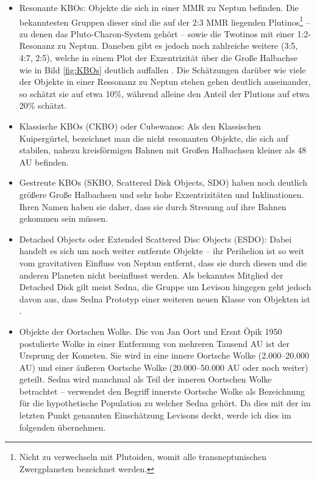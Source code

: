 \documentclass[12pt,a4paper,twoside,open=right,bibliography=totoc]{scrbook}
\renewcommand{\cite}{ \citep}
\begin{document}
\begin{itemize}
\item Resonante KBOs: Objekte die sich in einer MMR zu Neptun befinden. Die bekanntesten Gruppen dieser sind die auf der 2:3 MMR liegenden Plutinos\footnote{Nicht zu verwechseln mit Plutoiden, womit alle transneptunischen Zwergplaneten bezeichnet werden.} -- zu denen das Pluto-Charon-System gehört -- sowie die Twotinos mit einer 1:2-Resonanz zu Neptun. Daneben gibt es jedoch noch zahlreiche weitere (3:5, 4:7, 2:5), welche in einem Plot der Exzentrizität über die Große Halbachse wie in Bild \ref{fig:KBOs} deutlich auffallen\cite{Levison2008}.
Die Schätzungen darüber wie viele der Objekte in einer Ressonanz zu Neptun stehen gehen deutlich auseinander, 
so schätzt sie \cite{Trujillo2001,Levison2008} auf etwa 10\%, während \cite{Kavelaars2008,Levison2008} alleine den Anteil der Plutions auf etwa 20\% schätzt.
\item Klassische KBOs (CKBO) oder Cubewanos: Als den Klassischen Kuipergürtel, bezeichnet man die nicht resonanten Objekte, die sich auf stabilen, nahezu kreisförmigen Bahnen mit Großen Halbachsen kleiner als 48 AU befinden.
\item Gestreute KBOs (SKBO, Scattered Disk Objects, SDO) haben noch deutlich größere Große Halbachsen und sehr hohe Exzentrizitäten und Inklinationen. Ihren Namen haben sie daher, dass sie durch Streuung auf ihre Bahnen gekommen sein müssen.
\item Detached Objects oder Extended Scattered Disc Objects (ESDO): Dabei handelt es sich um noch weiter entfernte Objekte -- ihr Perihelion ist so weit vom gravitativen Einfluss von Neptun entfernt, dass sie durch diesen und die anderen Planeten nicht beeinflusst werden. Als bekanntes Mitglied der Detached Disk gilt meist Sedna, die Gruppe um Levison hingegen geht jedoch davon aus, dass Sedna Prototyp einer weiteren neuen Klasse von Objekten ist\cite{Morbidelli2004,Kenyon2004,Brasser2006,Levison2008}.
\item Objekte der Oortschen Wolke. Die von Jan Oort und Ersnt Öpik 1950 postulierte Wolke in einer Entfernung von mehreren Tausend AU ist der Ursprung der Kometen. Sie wird in eine innere Oortsche  Wolke (2.000–20.000 AU) und einer äußeren Oortsche Wolke (20.000–50.000 AU oder noch weiter) geteilt. Sedna wird manchmal als Teil der inneren Oortschen Wolke betrachtet – \cite{Brasser2008} verwendet den Begriff innerste Oortsche Wolke als Bezeichnung für die hypothetische Population zu welcher Sedna gehört. Da dies mit der im letzten Punkt genannten Einschätzung Levisons deckt, werde ich dies im folgenden übernehmen.
\end{itemize}
\end{document}
